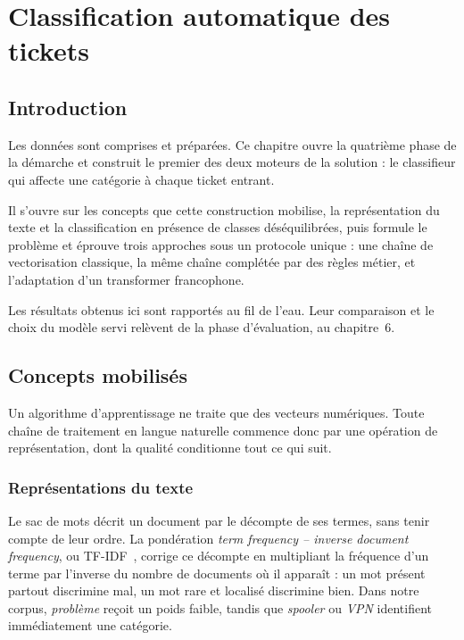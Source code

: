 \chapter{Classification automatique des tickets}

\section*{Introduction}

Les données sont comprises et préparées. Ce chapitre ouvre la quatrième phase de la démarche et
construit le premier des deux moteurs de la solution : le classifieur qui affecte une catégorie à
chaque ticket entrant.

Il s'ouvre sur les concepts que cette construction mobilise, la représentation du texte et la
classification en présence de classes déséquilibrées, puis formule le problème et éprouve trois
approches sous un protocole unique : une chaîne de vectorisation classique, la même chaîne complétée
par des règles métier, et l'adaptation d'un transformer francophone.

Les résultats obtenus ici sont rapportés au fil de l'eau. Leur comparaison et le choix du modèle
servi relèvent de la phase d'évaluation, au chapitre~6.

\section{Concepts mobilisés}

Un algorithme d'apprentissage ne traite que des vecteurs numériques. Toute chaîne de traitement en
langue naturelle commence donc par une opération de représentation, dont la qualité conditionne tout
ce qui suit.

\subsection{Représentations du texte}

Le sac de mots décrit un document par le décompte de ses termes, sans tenir compte de leur ordre. La
pondération \emph{term frequency -- inverse document frequency}, ou TF-IDF~\cite{sparckjones1972},
corrige ce décompte en
multipliant la fréquence d'un terme par l'inverse du nombre de documents où il apparaît : un mot
présent partout discrimine mal, un mot rare et localisé discrimine bien. Dans notre corpus,
\emph{problème} reçoit un poids faible, tandis que \emph{spooler} ou \emph{VPN} identifient
immédiatement une catégorie.

